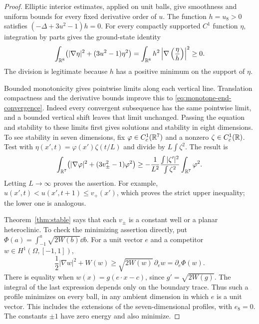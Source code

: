 \begin{proof}
Elliptic interior estimates, applied on unit balls, give smoothness and
uniform bounds for every fixed derivative order of $u$.  The function
$h=u_8>0$ satisfies $(-\Delta+3u^2-1)h=0$.  For every compactly supported
$C^1$ function $\eta$, integration by parts gives the ground-state identity
\begin{equation}
 \int_{\mathbb R^8}\bigl(|\nabla\eta|^2+(3u^2-1)\eta^2\bigr)
   =\int_{\mathbb R^8}h^2\left|\nabla\left(\frac\eta h\right)\right|^2
   \ge0.
 \label{eq:monotone-ground-state}
\end{equation}
The division is legitimate because $h$ has a positive minimum on the
support of $\eta$.

Bounded monotonicity gives pointwise limits along each vertical line.
Translation compactness and the derivative bounds improve this to
\eqref{eq:monotone-end-convergence}.  Indeed every convergent subsequence
has the same pointwise limit, and a bounded vertical shift leaves that
limit unchanged.  Passing the equation and stability to these limits first
gives solutions and stability in eight dimensions.  To see stability in
seven dimensions, fix $\varphi\in C_c^1(\mathbb R^7)$ and a nonzero
$\zeta\in C_c^1(\mathbb R)$.  Test with
$\eta(x',t)=\varphi(x')\zeta(t/L)$ and divide by
$L\int\zeta^2$.  The result is
\[
 \int_{\mathbb R^7}\bigl(|\nabla\varphi|^2+(3v_\pm^2-1)\varphi^2\bigr)
 \ge -\frac1{L^2}\frac{\int|\zeta'|^2}{\int\zeta^2}
                         \int_{\mathbb R^7}\varphi^2.
\]
Letting $L\to\infty$ proves the assertion.  For example,
$u(x',t)<u(x',t+1)\le v_+(x')$, which proves the strict upper
inequality; the lower one is analogous.

Theorem~\ref{thm:stable} says that each $v_\pm$ is a constant well or
a planar heteroclinic.  To check the minimizing assertion directly, put
$\Phi(a)=\int_{-1}^a\sqrt{2W(b)}\dd b$.  For a unit vector $e$ and a
competitor $w\in H^1(\Omega,[-1,1])$,
\begin{equation}
 \frac12|\nabla w|^2+W(w)
    \ge \sqrt{2W(w)}\,\partial_e w
    =\partial_e\Phi(w).
 \label{eq:monotone-calibration}
\end{equation}
There is equality when $w(x)=g(e\cdot x-c)$, since
$g'=\sqrt{2W(g)}$.  The integral of the last expression depends only
on the boundary trace.  Thus such a profile minimizes on every ball, in
any ambient dimension in which $e$ is a unit vector.  This includes the
extensions of the seven-dimensional profiles, with $e_8=0$.  The
constants $\pm1$ have zero energy and also minimize.
\end{proof}

